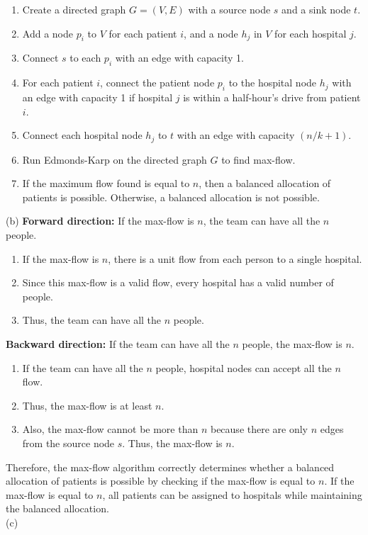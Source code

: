 \documentclass[12pt]{article}
\begin{document}
\begin{enumerate}[1.]
    \item Create a directed graph $G=(V,E)$ with a source node $s$ and a sink node $t$.
    \item Add a node $p_i$ to $V$ for each patient $i$, and a node $h_j$ in $V$ for each hospital $j$.
    \item Connect $s$ to each $p_i$ with an edge with capacity 1.
    \item For each patient $i$, connect the patient node $p_i$ to the hospital node $h_j$ with an edge with capacity 1 if hospital $j$ is within a half-hour's drive from patient $i$.
    \item Connect each hospital node $h_j$ to $t$ with an edge with capacity $(n/k+1)$.
    \item Run Edmonds-Karp on the directed graph $G$ to find max-flow.
    \item If the maximum flow found is equal to $n$, then a balanced allocation of patients is possible. Otherwise, a balanced allocation is not possible.
\end{enumerate}
(b)
\textbf{Forward direction:} If the max-flow is $n$, the team can have all the $n$ people.

\begin{enumerate}
\item If the max-flow is $n$, there is a unit flow from each person to a single hospital.
\item Since this max-flow is a valid flow, every hospital has a valid number of people.
\item Thus, the team can have all the $n$ people.
\end{enumerate}

\textbf{Backward direction:} If the team can have all the $n$ people, the max-flow is $n$.

\begin{enumerate}
\item If the team can have all the $n$ people, hospital nodes can accept all the $n$ flow.
\item Thus, the max-flow is at least $n$.
\item Also, the max-flow cannot be more than $n$ because there are only $n$ edges from the source node $s$. Thus, the max-flow is $n$.
\end{enumerate}

Therefore, the max-flow algorithm correctly determines whether a balanced allocation of patients is possible by checking if the max-flow is equal to $n$. If the max-flow is equal to $n$, all patients can be assigned to hospitals while maintaining the balanced allocation.
\\(c)
\end{document}
